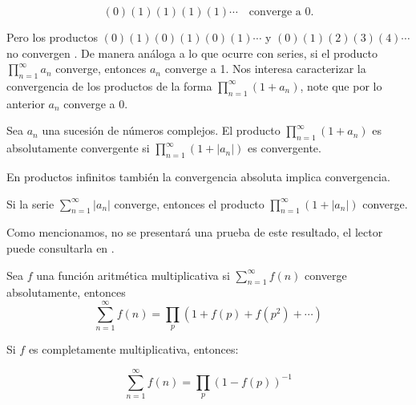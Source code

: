 $$(0)(1)(1)(1)(1)\cdots \quad \text{converge a 0.}$$

Pero los productos $(0)(1)(0)(1)(0)(1)\cdots$ y $(0)(1)(2)(3)(4)\cdots$ no convergen \cite{pongsriiam2023analytic}. De manera análoga a lo que ocurre con series, si el producto $\displaystyle\prod_{n=1}^{\infty} a_n$ converge, entonces $a_n$ converge a 1. Nos interesa caracterizar la convergencia de los productos de la forma $\displaystyle \prod_{n=1}^{\infty} (1+a_n)$, note que por lo anterior $a_n$ converge a 0.

\begin{definition}
Sea $a_n$ una sucesión de números complejos. El producto $\displaystyle\prod_{n=1}^{\infty} (1+a_n)$ es absolutamente convergente si $\displaystyle\prod_{n=1}^{\infty} (1+\left|a_n\right|)$ es convergente.
\end{definition}

En productos infinitos también la convergencia absoluta implica convergencia.

\begin{theorem}
Si la serie $\displaystyle\sum_{n=1}^{\infty} |a_n|$ converge, entonces el producto $\displaystyle\prod_{n=1}^{\infty} (1+|a_n|)$ converge.
\end{theorem}

Como mencionamos, no se presentará una prueba de este resultado, el lector puede consultarla en \cite{Apostol:105425}.

\begin{theorem}
Sea $f$ una función aritmética multiplicativa si $\displaystyle\sum_{n=1}^{\infty} f(n)$ converge absolutamente, entonces
$$\sum_{n=1}^{\infty} f(n)=\prod_p\left(1+f(p)+f\left(p^2\right)+\cdots\right)$$

Si $f$ es completamente multiplicativa, entonces:

$$\sum_{n=1}^{\infty} f(n)=\prod_p(1-f(p))^{-1}$$
\end{theorem}

